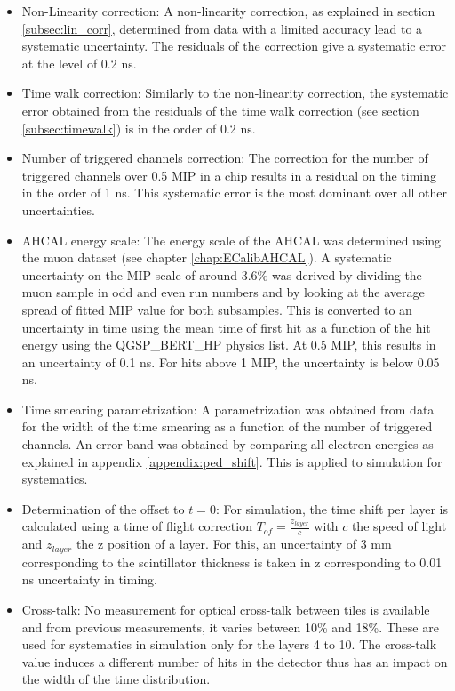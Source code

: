 \begin{itemize}
	\item Non-Linearity correction: A non-linearity correction, as explained in section \ref{subsec:lin_corr}, determined from data with a limited accuracy lead to a systematic uncertainty. The residuals of the correction give a systematic error at the level of 0.2 ns.
	\item Time walk correction: Similarly to the non-linearity correction, the systematic error obtained from the residuals of the time walk correction (see section \ref{subsec:timewalk}) is in the order of 0.2 ns.
	\item Number of triggered channels correction: The correction for the number of triggered channels over 0.5 MIP in a chip results in a residual on the timing in the order of 1 ns. This systematic error is the most dominant over all other uncertainties.
	\item AHCAL energy scale: The energy scale of the AHCAL was determined using the muon dataset (see chapter \ref{chap:ECalibAHCAL}). A systematic uncertainty on the MIP scale of around 3.6\% was derived by dividing the muon sample in odd and even run numbers and by looking at the average spread of fitted MIP value for both subsamples. This is converted to an uncertainty in time using the mean time of first hit as a function of the hit energy using the QGSP\_BERT\_HP physics list. At 0.5 MIP, this results in an uncertainty of 0.1 ns. For hits above 1 MIP, the uncertainty is below 0.05 ns.
	\item Time smearing parametrization: A parametrization was obtained from data for the width of the time smearing as a function of the number of triggered channels. An error band was obtained by comparing all electron energies as explained in appendix \ref{appendix:ped_shift}. This is applied to simulation for systematics.
	\item Determination of the offset to $t=0$: For simulation, the time shift per layer is calculated using a time of flight correction $T_{of} = \frac{z_{layer}}{c}$ with $c$ the speed of light and $z_{layer}$ the z position of a layer. For this, an uncertainty of 3 mm corresponding to the scintillator thickness is taken in z corresponding to 0.01 ns uncertainty in timing.
	\item Cross-talk: No measurement for optical cross-talk between tiles is available and from previous measurements, it varies between 10\% and 18\%. These are used for systematics in simulation only for the layers 4 to 10. The cross-talk value induces a different number of hits in the detector thus has an impact on the width of the time distribution.

\end{itemize}
